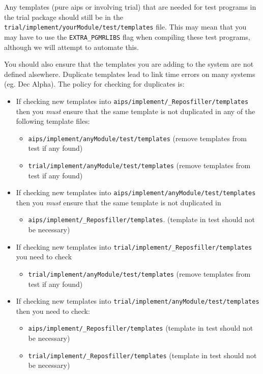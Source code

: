 Any templates (pure aips or involving trial) that are needed for test
programs in the trial package should still be in the
\texttt{trial/implement/yourModule/test/templates} file. This may mean that
you may have to use the \texttt{EXTRA\_PGMRLIBS} flag when compiling these
test programs, although we will attempt to automate this.

You should also ensure that the templates you are adding to the system are
not defined alsewhere. Duplicate templates lead to
link time errors on many systems (eg. Dec Alpha). The policy for checking
for duplicates is:
\begin{itemize}
\item If checking new templates into
  \texttt{aips/implement/\_Reposfiller/templates} then you \emph{must}
  ensure that the same template is not duplicated in any of the following
  template files:
  \begin{itemize}
  \item \texttt{aips/implement/anyModule/test/templates} 
    (remove templates from test if any found)
  \item \texttt{trial/implement/anyModule/test/templates} 
    (remove templates from test if any found)
  \end{itemize}
\item If checking new templates into
  \texttt{aips/implement/anyModule/test/templates} then you \emph{must}
  ensure that the same template is not duplicated in
  \begin{itemize}
  \item \texttt{aips/implement/\_Reposfiller/templates}.  (template in
    test should not be necessary)
  \end{itemize}
\item If checking new templates into
  \texttt{trial/implement/\_Reposfiller/templates} you need to check
  \begin{itemize}
  \item \texttt{trial/implement/anyModule/test/templates} (remove templates
    from test if any found)
  \end{itemize}
\item If checking new templates into
  \texttt{trial/implement/anyModule/test/templates} then you need to check:
  \begin{itemize}
  \item \texttt{aips/implement/\_Reposfiller/templates} (template in test
    should not be necessary)
  \item \texttt{trial/implement/\_Reposfiller/templates} (template in test
    should not be necessary)
  \end{itemize}
  
\end{itemize}

